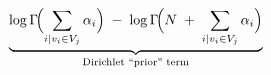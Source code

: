 \[
\underbrace{
\log\Gamma\!\Bigl(\sum_{i \mid v_i \in V_j} \alpha_i\Bigr)
\;-\;
\log\Gamma\!\Bigl(N \;+\; \sum_{i \mid v_i \in V_j} \alpha_i\Bigr)
}_{\text{Dirichlet “prior” term}}
\]
